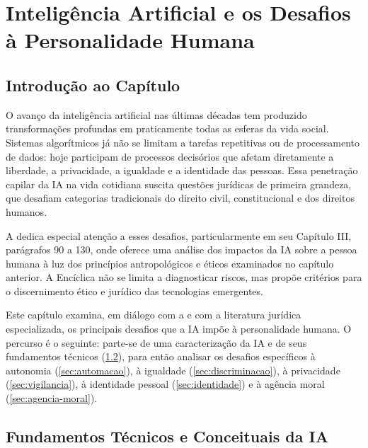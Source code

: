 
\chapter{Inteligência Artificial e os Desafios à Personalidade Humana}
\label{cap:ia-desafios}

\section{Introdução ao Capítulo}
\label{sec:intro-cap3}

O avanço da inteligência artificial nas últimas décadas tem produzido transformações profundas em praticamente todas as esferas da vida social. Sistemas algorítmicos já não se limitam a tarefas repetitivas ou de processamento de dados: hoje participam de processos decisórios que afetam diretamente a liberdade, a privacidade, a igualdade e a identidade das pessoas. Essa penetração capilar da IA na vida cotidiana suscita questões jurídicas de primeira grandeza, que desafiam categorias tradicionais do direito civil, constitucional e dos direitos humanos.

A \MH{} dedica especial atenção a esses desafios, particularmente em seu Capítulo III, parágrafos 90 a 130, onde oferece uma análise dos impactos da IA sobre a pessoa humana à luz dos princípios antropológicos e éticos examinados no capítulo anterior. A Encíclica não se limita a diagnosticar riscos, mas propõe critérios para o discernimento ético e jurídico das tecnologias emergentes.

Este capítulo examina, em diálogo com a \MH{} e com a literatura jurídica especializada, os principais desafios que a IA impõe à personalidade humana. O percurso é o seguinte: parte-se de uma caracterização da IA e de seus fundamentos técnicos (\ref{sec:fundamentos-ia}), para então analisar os desafios específicos à autonomia (\ref{sec:automacao}), à igualdade (\ref{sec:discriminacao}), à privacidade (\ref{sec:vigilancia}), à identidade pessoal (\ref{sec:identidade}) e à agência moral (\ref{sec:agencia-moral}).

\section{Fundamentos Técnicos e Conceituais da IA}
\label{sec:fundamentos-ia}

